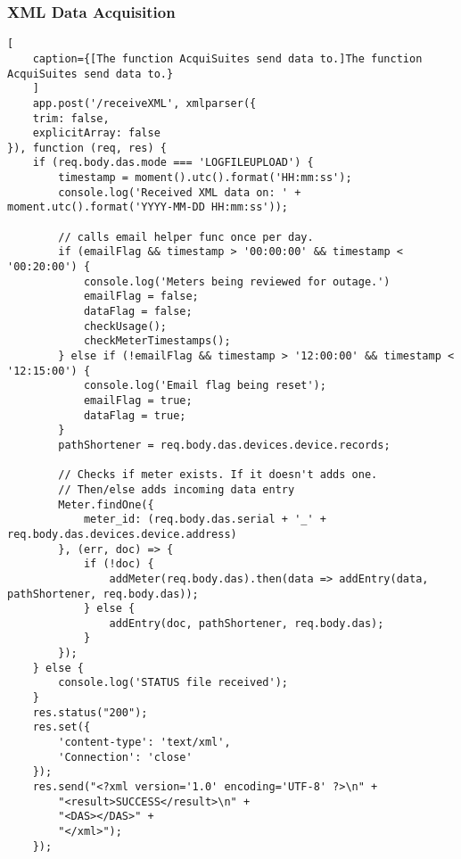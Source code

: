 \subsubsection{XML Data Acquisition}
\label{sec:XML}
\begin{lstlisting}[
    caption={[The function AcquiSuites send data to.]The function AcquiSuites send data to.}
    ]
    app.post('/receiveXML', xmlparser({
    trim: false,
    explicitArray: false
}), function (req, res) {
    if (req.body.das.mode === 'LOGFILEUPLOAD') {
        timestamp = moment().utc().format('HH:mm:ss');
        console.log('Received XML data on: ' + moment.utc().format('YYYY-MM-DD HH:mm:ss'));

        // calls email helper func once per day.
        if (emailFlag && timestamp > '00:00:00' && timestamp < '00:20:00') {
            console.log('Meters being reviewed for outage.')
            emailFlag = false;
            dataFlag = false;
            checkUsage();
            checkMeterTimestamps();
        } else if (!emailFlag && timestamp > '12:00:00' && timestamp < '12:15:00') {
            console.log('Email flag being reset');
            emailFlag = true;
            dataFlag = true;
        }
        pathShortener = req.body.das.devices.device.records;

        // Checks if meter exists. If it doesn't adds one.
        // Then/else adds incoming data entry
        Meter.findOne({
            meter_id: (req.body.das.serial + '_' + req.body.das.devices.device.address)
        }, (err, doc) => {
            if (!doc) {
                addMeter(req.body.das).then(data => addEntry(data, pathShortener, req.body.das));
            } else {
                addEntry(doc, pathShortener, req.body.das);
            }
        });
    } else {
        console.log('STATUS file received');
    }
    res.status("200");
    res.set({
        'content-type': 'text/xml',
        'Connection': 'close'
    });
    res.send("<?xml version='1.0' encoding='UTF-8' ?>\n" +
        "<result>SUCCESS</result>\n" +
        "<DAS></DAS>" +
        "</xml>");
	});
        
\end{lstlisting}
